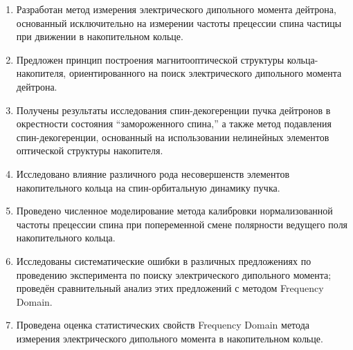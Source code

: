
\begin{enumerate}
	\item Разработан метод измерения электрического дипольного момента дейтрона, 
	основанный исключительно на измерении частоты прецессии спина частицы 
	при движении в накопительном кольце.
	\item Предложен принцип построения магнитооптической структуры кольца-накопителя, 
	ориентированного на поиск электрического дипольного момента дейтрона.
	\item Получены результаты исследования спин-декогеренции пучка дейтронов в окрестности 
	состояния ``замороженного спина,'' а также метод подавления спин-декогеренции, основанный на использовании нелинейных элементов оптической структуры накопителя.
	\item Исследовано влияние различного рода несовершенств элементов накопительного кольца 
	на спин-орбитальную динамику пучка.
	\item Проведено численное моделирование метода калибровки нормализованной частоты прецессии спина 
	при попеременной смене полярности ведущего поля накопительного кольца.
	\item Исследованы систематические ошибки в различных предложениях по проведению эксперимента 
	по поиску электрического дипольного момента; проведён сравнительный анализ этих предложений 
	с методом Frequency Domain.
	\item Проведена оценка статистических свойств Frequency Domain метода измерения 
	электрического дипольного момента в накопительном кольце.
\end{enumerate}
